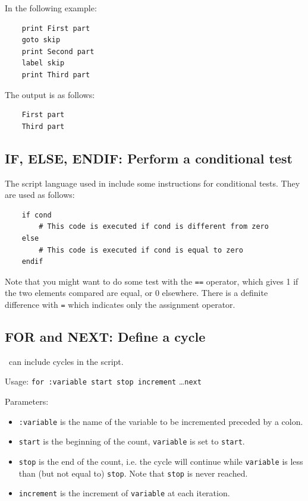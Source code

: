     In the following example:
    
    \begin{lstlisting}
    print First part
    goto skip
    print Second part
    label skip
    print Third part
    \end{lstlisting}
    
    The output is as follows:
    
    \begin{lstlisting}
    First part
    Third part
    \end{lstlisting}
    
\subsection{IF, ELSE, ENDIF: Perform a conditional test}
The script language used in \afmm include some instructions for conditional tests. They are used as follows:

 \begin{lstlisting}
    if cond
        # This code is executed if cond is different from zero
    else
        # This code is executed if cond is equal to zero
    endif
\end{lstlisting}
Note that you might want to do some test with the \lstinline!==! operator, which gives 1 if the two elements compared are equal, or 0 elsewhere. There is a definite difference with \lstinline!=! which indicates only the assignment operator.


\subsection{FOR and NEXT: Define a cycle}
    \Afmm\ can include cycles in the script.
    
    Usage: \lstinline!for :variable start stop increment! \dots \lstinline!next!
    
    Parameters:
    \begin{itemize}
    \item \lstinline{:variable} is the name of the variable to be incremented
        preceded by a colon.
    \item \lstinline{start} is the beginning of the count, \lstinline{variable} is set to \lstinline{start}.
    \item \lstinline{stop} is the end of the count, i.e. the cycle will continue while  \lstinline{variable} is less than (but not equal to) \lstinline{stop}. Note that \lstinline{stop} is never reached.
    \item \lstinline{increment} is the increment of \lstinline{variable} at each iteration.
    \end{itemize}
    
